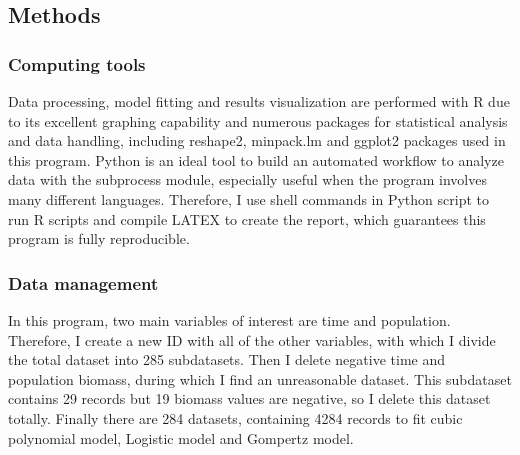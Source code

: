 \documentclass[11pt]{article}
\begin{document}
  \subsection{Methods}
    \subsubsection{Computing tools}
      Data processing, model fitting and results visualization are performed with R due to its excellent 
      graphing capability and numerous packages for statistical analysis and data handling, including reshape2, 
      minpack.lm and ggplot2 packages used in this program. Python is an ideal tool to build an automated 
      workflow to analyze data with the subprocess module, especially useful when the program involves many 
      different languages. Therefore, I use shell commands in Python script to run R scripts and compile LATEX 
      to create the report, which guarantees this program is fully reproducible.


    \subsubsection{Data management}
      In this program, two main variables of interest are time and population. Therefore, I create 
      a new ID with all of the other variables, with which I divide the total dataset into 285 subdatasets. 
      Then I delete negative time and population biomass, during which I find an unreasonable dataset. This 
      subdataset contains 29 records but 19 biomass values are negative, so I delete this dataset totally. 
      Finally there are 284 datasets, containing 4284 records to fit cubic polynomial model, Logistic model 
      and Gompertz model.
\end{document}
